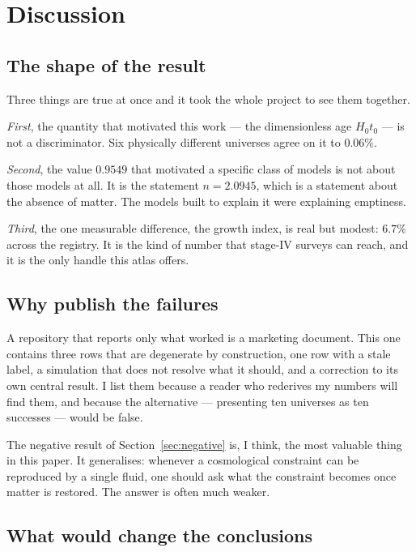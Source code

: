 \documentclass[11pt,a4paper]{article}
\theoremstyle{definition}
\begin{document}
\section{Discussion}
\label{sec:discussion}

\subsection{The shape of the result}

Three things are true at once and it took the whole project to see them
together.

\emph{First}, the quantity that motivated this work --- the dimensionless age
$H_0t_0$ --- is not a discriminator. Six physically different universes agree
on it to $0.06\%$.

\emph{Second}, the value $0.9549$ that motivated a specific class of models is
not about those models at all. It is the statement $n = 2.0945$, which is a
statement about the absence of matter. The models built to explain it were
explaining emptiness.

\emph{Third}, the one measurable difference, the growth index, is real but
modest: $6.7\%$ across the registry. It is the kind of number that stage-IV
surveys can reach, and it is the only handle this atlas offers.

\subsection{Why publish the failures}

A repository that reports only what worked is a marketing document. This
one contains three rows that are degenerate by construction, one row with a
stale label, a simulation that does not resolve what it should, and a
correction to its own central result. I list them because a reader who
rederives my numbers will find them, and because the alternative ---
presenting ten universes as ten successes --- would be false.

The negative result of Section~\ref{sec:negative} is, I think, the most
valuable thing in this paper. It generalises: whenever a cosmological
constraint can be reproduced by a single fluid, one should ask what the
constraint becomes once matter is restored. The answer is often much weaker.

\subsection{What would change the conclusions}
\end{document}
